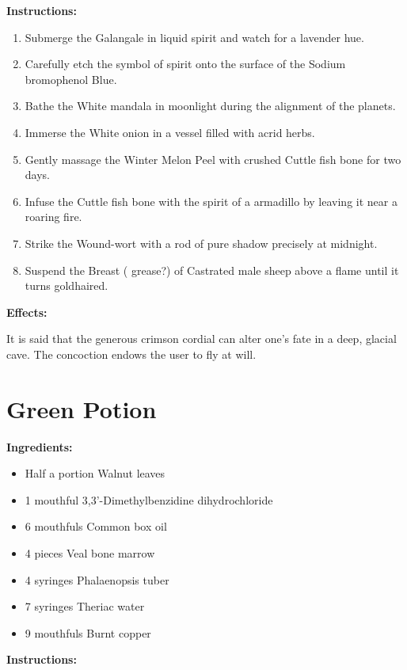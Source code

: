 \documentclass{article}
\begin{document}
\textbf{Instructions:}

\begin{enumerate}
  \item Submerge the Galangale in liquid spirit and watch for a lavender hue.
  \item Carefully etch the symbol of spirit onto the surface of the Sodium bromophenol Blue.
  \item Bathe the White mandala in moonlight during the alignment of the planets.
  \item Immerse the White onion in a vessel filled with acrid herbs.
  \item Gently massage the Winter Melon Peel with crushed Cuttle fish bone for two days.
  \item Infuse the Cuttle fish bone with the spirit of a armadillo by leaving it near a roaring fire.
  \item Strike the Wound-wort with a rod of pure shadow precisely at midnight.
  \item Suspend the Breast ( grease?) of Castrated male sheep above a flame until it turns goldhaired.
\end{enumerate}

\textbf{Effects:}

It is said that the generous crimson cordial can alter one's fate in a deep, glacial cave. The concoction endows the user to fly at will.

\newpage
\section*{Green Potion}

\textbf{Ingredients:}

\begin{itemize}
  \item Half a portion Walnut leaves
  \item 1 mouthful 3,3'-Dimethylbenzidine dihydrochloride
  \item 6 mouthfuls Common box oil
  \item 4 pieces Veal  bone marrow
  \item 4 syringes Phalaenopsis tuber
  \item 7 syringes Theriac water
  \item 9 mouthfuls Burnt copper
\end{itemize}

\textbf{Instructions:}
\end{document}
